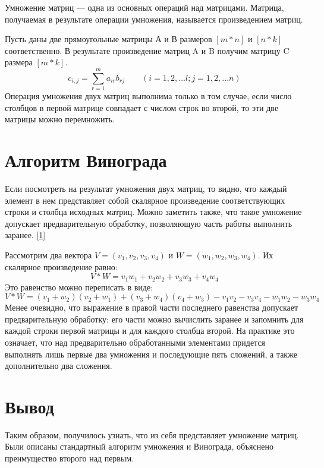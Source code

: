 \documentclass[12pt]{report}
\begin{document}
	Умножение матриц — одна из основных операций над матрицами. Матрица, получаемая в результате операции умножения, называется произведением матриц.
	
	Пусть даны две прямоугольные матрицы А и В размеров $[m * n]$ и $[n * k]$ соответственно.  
	В результате произведение матриц A и B получим матрицу C размера $[m *  k]$.
		\begin{equation}
		c_{i,j} = \sum_{r=1}^{m}a_{ir}b_{rj} \qquad (i=1,2,...l; j = 1,2,...n)
	\end{equation}
	Операция умножения двух матриц выполнима только в том случае, если число столбцов в первой матрице совпадает с числом строк во второй, то эти две матрицы можно перемножить.
	

	\section{Алгоритм Винограда}
	Если посмотреть на результат умножения двух матриц, то видно, что каждый элемент в нем представляет собой скалярное произведение соответствующих строки и столбца исходных матриц. Можно заметить также, что такое умножение допускает предварительную обработку, позволяющую часть работы выполнить заранее. \hyperref[literature]{[1]}\par
	Рассмотрим два вектора $V = (v_{1},v_{2},v_{3},v_{4})$ и $W = (w_{1},w_{2},w_{3},w_{4})$. Их скалярное произведение равно:
	\begin{equation}
		V * W = v_{1}w_{1} + v_{2}w_{2} + v_{3}w_{3} + v_{4}w_{4}
	\end{equation}
	Это равенство можно переписать в виде:
	\begin{equation}
		V * W = (v_{1} + w_{2})(v_{2} + w_{1}) + (v_{3} + w_{4})(v_{4} + w_{3}) -  v_{1}v_{2} - v_{3}v_{4} - w_{1}w_{2} - w_{3}w_{4}
	\end{equation}
	Менее очевидно, что выражение в правой части последнего равенства допускает предварительную обработку: его части можно вычислить заранее и запомнить для каждой строки первой матрицы и для каждого столбца второй. На практике это означает, что над предварительно обработанными элементами придется выполнять лишь первые два умножения и последующие пять сложений, а также дополнительно два сложения. 
	
	\section*{Вывод}
	Таким образом, получилось узнать, что из себя представляет умножение матриц. Были описаны стандартный алгоритм умножения и Винограда, объяснено преимущество второго над первым.
	
\end{document}
